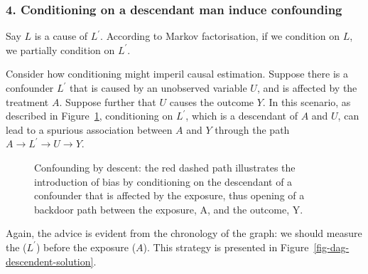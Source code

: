 \documentclass[
  singlecolumn,
  9pt]{article}
\begin{document}
\subsubsection{4. Conditioning on a descendant man induce
confounding}\label{conditioning-on-a-descendant-man-induce-confounding}

Say \(L\) is a cause of \(L^\prime\). According to Markov factorisation,
if we condition on \(L\), we partially condition on \(L^\prime\).

Consider how conditioning might imperil causal estimation. Suppose there
is a confounder \(L^\prime\) that is caused by an unobserved variable
\(U\), and is affected by the treatment \(A\). Suppose further that
\(U\) causes the outcome \(Y\). In this scenario, as described in
Figure~\ref{fig-dag-descendent}, conditioning on \(L^\prime\), which is
a descendant of \(A\) and \(U\), can lead to a spurious association
between \(A\) and \(Y\) through the path \(A \to L^\prime \to U \to Y\).

\begin{figure}


\caption{\label{fig-dag-descendent}Confounding by descent: the red
dashed path illustrates the introduction of bias by conditioning on the
descendant of a confounder that is affected by the exposure, thus
opening of a backdoor path between the exposure, A, and the outcome, Y.}

\end{figure}%

Again, the advice is evident from the chronology of the graph: we should
measure the (\(L^\prime\)) before the exposure (\(A\)). This strategy is
presented in Figure~\ref{fig-dag-descendent-solution}.
\end{document}
